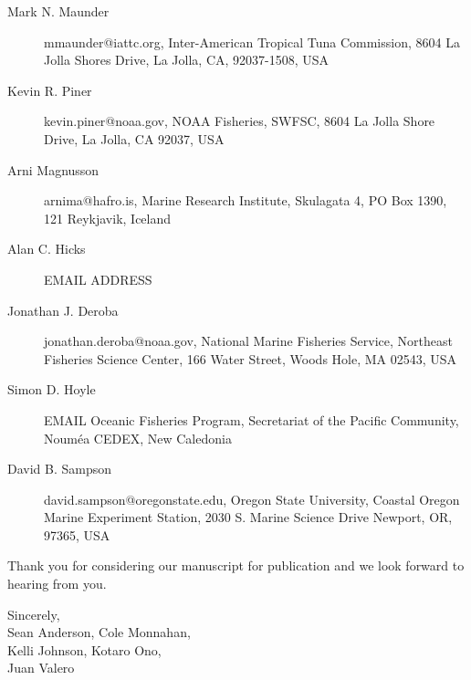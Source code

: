 \documentclass[letterpaper,11pt]{letter}
\begin{document}
\begin{letter}{}
\begin{description}
  \item [Mark N. Maunder] mmaunder@iattc.org, Inter-American Tropical Tuna
    Commission, 8604 La Jolla Shores Drive, La Jolla, CA, 92037-1508, USA
  \item [Kevin R. Piner] kevin.piner@noaa.gov, NOAA Fisheries, SWFSC, 8604 La
    Jolla Shore Drive, La Jolla, CA 92037, USA
  \item [Arni Magnusson] arnima@hafro.is, Marine Research Institute, Skulagata
    4, PO Box 1390, 121 Reykjavik, Iceland
  \item [Alan C. Hicks] EMAIL ADDRESS
  \item [Jonathan J. Deroba] jonathan.deroba@noaa.gov, National Marine Fisheries
    Service, Northeast Fisheries Science Center, 166 Water Street, Woods Hole,
    MA 02543, USA
  \item [Simon D. Hoyle] EMAIL Oceanic Fisheries Program, Secretariat of the Pacific
    Community, Nouméa CEDEX, New Caledonia
  \item [David B. Sampson] david.sampson@oregonstate.edu, Oregon State
    University, Coastal Oregon Marine Experiment Station, 2030 S. Marine Science
    Drive Newport, OR, 97365, USA
\end{description}

Thank you for considering our manuscript for publication and we look forward to
hearing from you.

\bigskip
\closing{Sincerely,\\
Sean Anderson, Cole Monnahan,\\Kelli Johnson, Kotaro Ono,\\Juan Valero}

\end{letter}
\end{document}
